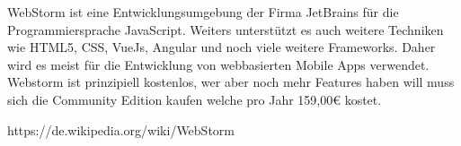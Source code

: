 WebStorm ist eine Entwicklungsumgebung der Firma JetBrains für die Programmiersprache JavaScript. Weiters unterstützt es auch weitere Techniken wie HTML5, CSS, VueJs, Angular und noch viele weitere Frameworks. Daher wird es meist für die Entwicklung von webbasierten Mobile Apps verwendet.
Webstorm ist prinzipiell kostenlos, wer aber noch mehr Features haben will muss sich die Community Edition kaufen welche pro Jahr 159,00€ kostet.



https://de.wikipedia.org/wiki/WebStorm